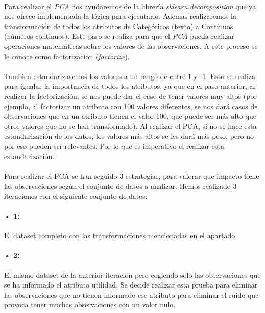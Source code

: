 \label{section:pca_standar}
\paragraph{}
Para realizar el \textit{PCA} nos ayudaremos de la librería \textit{sklearn.decomposition} que ya nos ofrece implementada la lógica para ejecutarlo. Ademas realizaremos la transformación de todos los atributos de Categóricos (texto) a Continuos (números continuos). Este paso se realiza para que el \textit{PCA} pueda realizar operaciones matemáticas sobre los valores de las observaciones. A este proceso se le conoce como factorización (\textit{factorize}). 

\paragraph{}
También estandarizaremos los valores a un rango de entre 1 y -1. Esto se realiza para igualar la importancia de todos los atributos, ya que en el paso anterior, al realizar la factorización, se nos puede dar el caso de tener valores muy altos (por ejemplo, al factorizar un atributo con 100 valores diferentes, se nos dará casos de observaciones que en un atributo tienen el valor 100, que puede ser más alto que otros valores que no se han transformado). Al realizar el PCA, si no se hace esta estandarización de los datos, los valores más altos se les dará más peso, pero no por eso pueden ser relevantes. Por lo que es imperativo el realizar esta estandarización.

\paragraph{}
Para realizar el PCA se han seguido 3 estrategias, para valorar que impacto tiene las observaciones según el conjunto de datos a analizar. Hemos realizado 3 iteraciones con el siguiente conjunto de datos:

\paragraph{• 1: } El dataset completo con las transformaciones mencionadas en el apartado 

\paragraph{• 2: } \label{section:pca_case2}El mismo dataset de la anterior iteración pero cogiendo solo las observaciones que se ha informado el atributo utilidad. Se decide realizar esta prueba para eliminar las observaciones que no tienen informado ese atributo para eliminar el ruido\cite{ref:noisy_data} que provoca tener muchas observaciones con un valor nulo.

